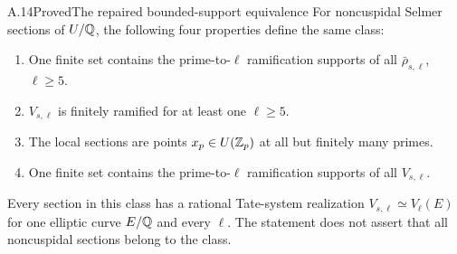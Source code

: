 \begin{statement}{A.14}{Proved}{The repaired bounded-support equivalence}
For noncuspidal Selmer sections of $U/\mathbb Q$, the following four properties
define the same class:
\begin{enumerate}[label=(\roman*)]
\item One finite set contains the prime-to-$\ell$ ramification supports
of all $\bar\rho_{s,\ell}$, $\ell\ge5$.
\item $V_{s,\ell}$ is finitely ramified for at least one $\ell\ge5$.
\item The local sections are points $x_p\in U(\mathbb Z_p)$ at all but
finitely many primes.
\item One finite set contains the prime-to-$\ell$ ramification
supports of all $V_{s,\ell}$.
\end{enumerate}
Every section in this class has a rational Tate-system realization
$V_{s,\ell}\simeq V_\ell(E)$ for one elliptic curve $E/\mathbb Q$ and every
$\ell$.  The statement does not assert that all noncuspidal sections
belong to the class.
\end{statement}
